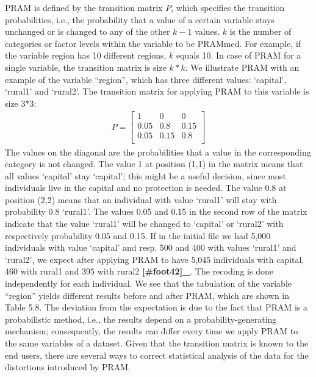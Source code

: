 \documentclass[letterpaper,10pt,english]{sphinxmanual}
\begin{document}
PRAM is defined by the transition matrix \(P\), which specifies the
transition probabilities, i.e., the probability that a value of a
certain variable stays unchanged or is changed to any of the other
\(k - 1\) values. \(k\) is the number of categories or factor
levels within the variable to be PRAMmed. For example, if the variable
region has 10 different regions, \(k\) equals 10. In case of PRAM
for a single variable, the transition matrix is size \(k*k\). We
illustrate PRAM with an example of the variable “region”, which has
three different values: ‘capital’, ‘rural1’ and ‘rural2’. The transition
matrix for applying PRAM to this variable is size 3*3:
\begin{equation*}
\begin{split}P = \begin{bmatrix}
1 & 0 & 0 \\
0.05 & 0.8 & 0.15 \\
0.05 & 0.15 & 0.8 \\
\end{bmatrix}\end{split}
\end{equation*}
The values on the diagonal are the probabilities that a value in the
corresponding category is not changed. The value 1 at position (1,1) in
the matrix means that all values ‘capital’ stay ‘capital’; this might be
a useful decision, since most individuals live in the capital and no
protection is needed. The value 0.8 at position (2,2) means that an
individual with value ‘rural1’ will stay with probability 0.8 ‘rural1’.
The values 0.05 and 0.15 in the second row of the matrix indicate that
the value ‘rural1’ will be changed to ‘capital’ or ‘rural2’ with
respectively probability 0.05 and 0.15. If in the initial file we had
5,000 individuals with value ‘capital’ and resp. 500 and 400 with values
‘rural1’ and ‘rural2’, we expect after applying PRAM to have 5,045
individuals with capital, 460 with rural1 and 395 with
rural2 {\color{red}\bfseries{}{[}\#foot42{]}\_}. The recoding is done independently for
each individual. We see that the tabulation of the variable “region”
yields different results before and after PRAM, which are shown in Table
5.8. The deviation from the expectation is due to the fact that PRAM is
a probabilistic method, i.e., the results depend on a
probability-generating mechanism; consequently, the results can differ
every time we apply PRAM to the same variables of a dataset.   Given that the transition matrix
is known to the end users, there are several ways to correct statistical
analysis of the data for the distortions introduced by PRAM.
\end{document}

